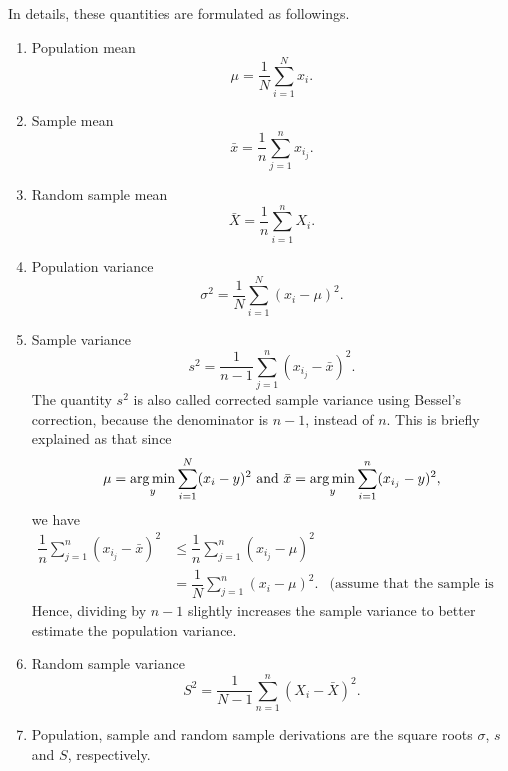 In details, these quantities are formulated as followings.
\begin{enumerate}
 \item Population mean
       \begin{equation}
        \mu = \frac{1}{N} \sum_{i=1}^N x_i.
       \end{equation}
 \item Sample mean
       \begin{equation}
        \bar{x} = \frac{1}{n} \sum_{j=1}^n x_{i_j}.
       \end{equation}
 \item Random sample mean
       \begin{equation}
        \bar{X} = \frac{1}{n} \sum_{i=1}^n X_i.
       \end{equation}
 \item Population variance
       \begin{equation}
        \sigma^2 = \dfrac{1}{N} \sum_{i=1}^N (x_i - \mu)^2.
       \end{equation}
 \item Sample variance
       \begin{equation}
        s^2 = \dfrac{1}{n-1} \sum_{j=1}^n (x_{i_j} - \bar{x})^2.
       \end{equation}
       The quantity $s^2$ is also called corrected sample variance using Bessel's correction, because the denominator is $n-1$, instead of $n$. This is briefly explained as that since $$\mu = \operatorname*{arg\,min}\limits_{y} \sum_{i=1}^N (x_i - y)^2 \text{ and } \bar{x} = \operatorname*{arg\,min}\limits_{y} \sum_{i=1}^n (x_{i_j} - y)^2,$$ we have
       \begin{align*}
        \dfrac{1}{n} \sum_{j=1}^n (x_{i_j} - \bar{x})^2
         & \le \dfrac{1}{n} \sum_{j=1}^n (x_{i_j} - \mu)^2                                               \\
         & = \dfrac{1}{N} \sum_{j=1}^n (x_{i} - \mu)^2.    & \text{(assume that the sample is unbiased)}
       \end{align*}
       Hence, dividing by $n-1$ slightly increases the sample variance to better estimate the population variance.
 \item Random sample variance
       \begin{equation}
        S^2 = \dfrac{1}{N-1} \sum_{n=1}^n (X_i - \bar{X})^2.
       \end{equation}
 \item Population, sample and random sample derivations are the square roots $\sigma$, $s$ and $S$, respectively.


\end{enumerate}
